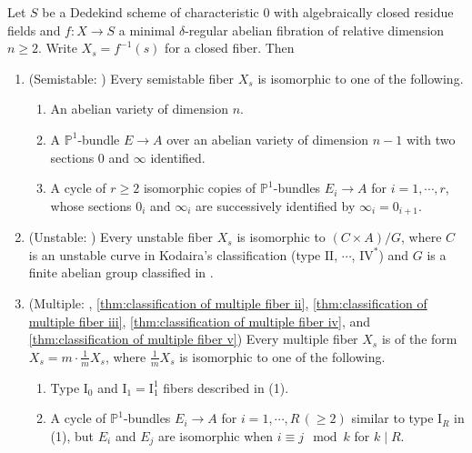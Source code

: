 \documentclass[reqno, letterpaper]{amsart}
\numberwithin{equation}{subsection}
\let\to\longrightarrow
\newcommand{\PP}{\mathbb{P}}
\begin{document}
	\begin{theorem} \label{thm:main}
		Let $S$ be a Dedekind scheme of characteristic $0$ with algebraically closed residue fields and $f : X \to S$ a minimal $\delta$-regular abelian fibration of relative dimension $n \ge 2$. Write $X_s = f^{-1}(s)$ for a closed fiber. Then
		\begin{enumerate}
			\item \textnormal{(Semistable: )} Every semistable fiber $X_s$ is isomorphic to one of the following.
			\begin{enumerate}
				\item[\textnormal{($\mathrm I_0$)}] An abelian variety of dimension $n$.
				\item[\textnormal{($\mathrm I_1$)}] A $\PP^1$-bundle $E \to A$ over an abelian variety of dimension $n-1$ with two sections $0$ and $\infty$ identified.
				\item[\textnormal{($\mathrm I_r$)}] A cycle of $r \ge 2$ isomorphic copies of $\PP^1$-bundles $E_i \to A$ for $i = 1, \cdots, r$, whose sections $0_i$ and $\infty_i$ are successively identified by $\infty_i = 0_{i+1}$.
			\end{enumerate}
			
			\item \textnormal{(Unstable: )} Every unstable fiber $X_s$ is isomorphic to $(C \times A)/G$, where $C$ is an unstable curve in Kodaira's classification (type $\mathrm {II}$, $\cdots$, $\mathrm{IV}^*$) and $G$ is a finite abelian group classified in .
			
			\item \textnormal{(Multiple: , \ref{thm:classification of multiple fiber ii}, \ref{thm:classification of multiple fiber iii}, \ref{thm:classification of multiple fiber iv}, and \ref{thm:classification of multiple fiber v})} Every multiple fiber $X_s$ is of the form $X_s = m \cdot \frac{1}{m} X_s$, where $\frac{1}{m}X_s$ is isomorphic to one of the following.
			\begin{enumerate}
				\item[\textnormal{($\mathrm I_0, \, \mathrm I^1_1$)}] Type $\mathrm I_0$ and $\mathrm I_1 = \mathrm I_1^1$ fibers described in (1).
				\item[\textnormal{($\mathrm I_R^k$)}] A cycle of $\PP^1$-bundles $E_i \to A$ for $i = 1, \cdots, R \, (\ge 2)$ similar to type $\mathrm I_R$ in (1), but $E_i$ and $E_j$ are isomorphic when $i \equiv j \mod k$ for $k \mid R$.
				

\end{enumerate}
\end{enumerate}
\end{theorem}
\end{document}
